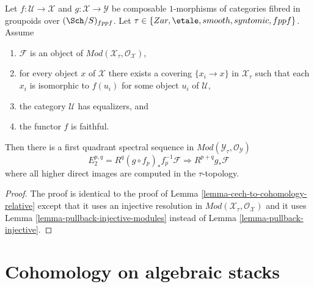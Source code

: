 \begin{lemma}
\label{lemma-cech-to-cohomology-relative-modules}
Let $f : \mathcal{U} \to \mathcal{X}$ and
$g : \mathcal{X} \to \mathcal{Y}$
be composable $1$-morphisms of categories fibred
in groupoids over $(\Sch/S)_{fppf}$. Let
$\tau \in \{Zar, \etale, smooth, syntomic, \linebreak[0] fppf\}$.
Assume
\begin{enumerate}
\item $\mathcal{F}$ is an object of
$\textit{Mod}(\mathcal{X}_\tau, \mathcal{O}_\mathcal{X})$,
\item for every object $x$ of $\mathcal{X}$ there exists a covering
$\{x_i \to x\}$ in $\mathcal{X}_\tau$ such that each $x_i$ is isomorphic
to $f(u_i)$ for some object $u_i$ of $\mathcal{U}$,
\item the category $\mathcal{U}$ has equalizers, and
\item the functor $f$ is faithful.
\end{enumerate}
Then there is a first quadrant spectral sequence in
$\textit{Mod}(\mathcal{Y}_\tau, \mathcal{O}_\mathcal{Y})$
$$
E_2^{p, q} = R^q(g \circ f_p)_*f_p^{-1}\mathcal{F}
\Rightarrow
R^{p + q}g_*\mathcal{F}
$$
where all higher direct images are computed in the $\tau$-topology.
\end{lemma}

\begin{proof}
The proof is identical to the proof of
Lemma \ref{lemma-cech-to-cohomology-relative}
except that it uses an injective resolution in
$\textit{Mod}(\mathcal{X}_\tau, \mathcal{O}_\mathcal{X})$
and it uses
Lemma \ref{lemma-pullback-injective-modules}
instead of
Lemma \ref{lemma-pullback-injective}.
\end{proof}






\section{Cohomology on algebraic stacks}
\label{section-cohomology}

